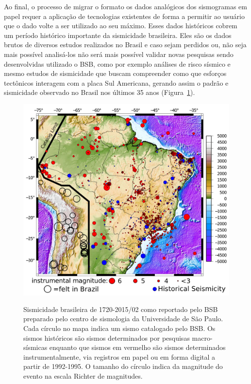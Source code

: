 \documentclass{article}
\begin{document}
Ao final, o processo de migrar o formato os dados analógicos dos
sismogramas em papel requer a aplicação de tecnologias existentes de
forma a permitir ao usuário que o dado volte a ser utilizado ao seu
máximo. Esses dados históricos cobrem um período histórico importante
da sismicidade brasileira. Eles são os dados brutos de diversos
estudos realizados no Brasil e caso sejam perdidos ou, não seja mais
possível analisá-los não será mais possível validar novas pesquisas
sendo desenvolvidas utilizado o BSB, como por exemplo análises de
risco sísmico e mesmo estudos de sismicidade que buscam compreender
como que esforços tectônicos interagem com a placa Sul Americana,
gerando assim o padrão e sismicidade observado no Brasil nos últimos
35 anos (Figura~\ref{sismicidade}).


\begin{figure}
  \begin{center}
    \includegraphics[scale=0.4]{mapa.png}
    \label{sismicidade}
    \caption{Sismicidade brasileira de 1720-2015/02 como reportado
      pelo BSB preparado pelo centro de sismologia da Universidade de
      São Paulo. Cada círculo no mapa indica um sismo catalogado pelo
      BSB. Os sismos históricos são sismos determinados por pesquisas
      macro-sísmicas enquanto que sismos em vermelho são sismos
      determinados instrumentalmente, via registros em papel ou em
      forma digital a partir de 1992-1995. O tamanho do círculo indica
      da magnitude do evento na escala Richter de magnitudes.}
  \end{center}
\end{figure}
\end{document}
